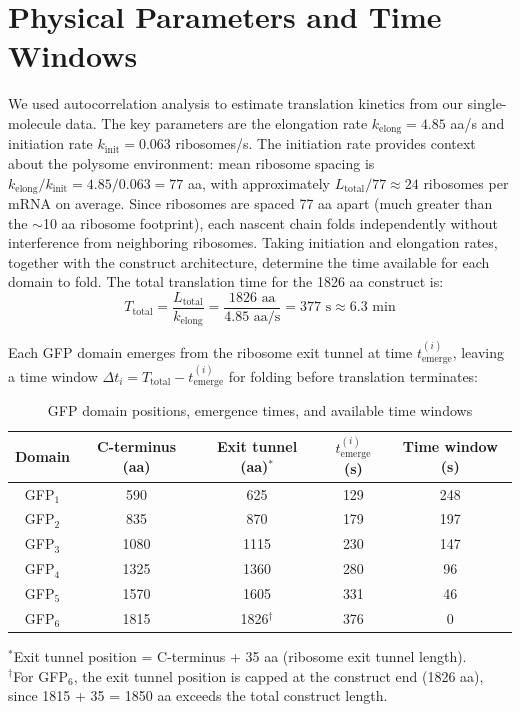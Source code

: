 \documentclass[11pt,a4paper]{article}
\newcommand{\kelong}{k_{\text{elong}}}
\newcommand{\kinit}{k_{\text{init}}}
\newcommand{\Ttotal}{T_{\text{total}}}
\newcommand{\temerge}{t_{\text{emerge}}}
\begin{document}
\section{Physical Parameters and Time Windows}

We used autocorrelation analysis to estimate translation kinetics from our single-molecule data. The key parameters are the elongation rate $\kelong = 4.85$ aa/s and initiation rate $\kinit = 0.063$ ribosomes/s. The initiation rate provides context about the polysome environment: mean ribosome spacing is $\kelong / \kinit = 4.85 / 0.063 = 77$ aa, with approximately $L_{\text{total}} / 77 \approx 24$ ribosomes per mRNA on average. Since ribosomes are spaced 77 aa apart (much greater than the $\sim$10 aa ribosome footprint), each nascent chain folds independently without interference from neighboring ribosomes. Taking initiation and elongation rates, together with the construct architecture, determine the time available for each domain to fold. The total translation time for the 1826 aa construct is:
\begin{equation}
\Ttotal = \frac{L_{\text{total}}}{\kelong} = \frac{1826 \text{ aa}}{4.85 \text{ aa/s}} = 377 \text{ s} \approx 6.3 \text{ min}
\end{equation}

Each GFP domain emerges from the ribosome exit tunnel at time $\temerge^{(i)}$, leaving a time window $\Delta t_i = \Ttotal - \temerge^{(i)}$ for folding before translation terminates:

\begin{table}[H]
\centering
\caption{GFP domain positions, emergence times, and available time windows}
\label{tab:emergence}
\begin{tabular}{@{}ccccc@{}}
\toprule
\textbf{Domain} & \textbf{C-terminus (aa)} & \textbf{Exit tunnel (aa)$^*$} & $\temerge^{(i)}$ \textbf{(s)} & \textbf{Time window (s)} \\
\midrule
GFP$_1$ & 590 & 625 & 129 & 248 \\
GFP$_2$ & 835 & 870 & 179 & 197 \\
GFP$_3$ & 1080 & 1115 & 230 & 147 \\
GFP$_4$ & 1325 & 1360 & 280 & 96 \\
GFP$_5$ & 1570 & 1605 & 331 & 46 \\
GFP$_6$ & 1815 & 1826$^\dagger$ & 376 & 0 \\
\bottomrule
\end{tabular}

\vspace{0.3em}
\parbox{0.95\textwidth}{\footnotesize
$^*$Exit tunnel position = C-terminus + 35 aa (ribosome exit tunnel length). \\
$^\dagger$For GFP$_6$, the exit tunnel position is capped at the construct end (1826 aa), since 1815 + 35 = 1850 aa exceeds the total construct length.
}
\end{table}
\end{document}
